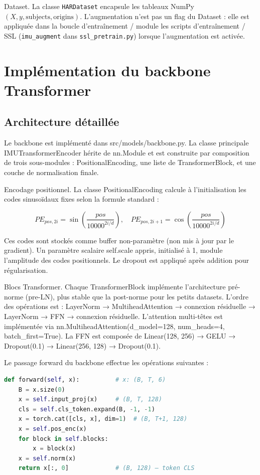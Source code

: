 \documentclass[a4paper,12pt]{report}
\begin{document}
Dataset. La classe \texttt{HARDataset} encapsule les tableaux NumPy
$(X, y, \mathrm{subjects}, \mathrm{origins})$. L'augmentation n'est pas un
flag du Dataset : elle est appliquée dans la boucle d'entraînement / module
les scripts d'entraînement / SSL (\texttt{imu\_augment} dans \texttt{ssl\_pretrain.py}) lorsque l'augmentation est activée.

\section{Implémentation du backbone Transformer}

\subsection{Architecture détaillée}

Le backbone est implémenté dans src/models/backbone.py. La classe principale IMUTransformerEncoder hérite de nn.Module et est construite par composition de trois sous-modules : PositionalEncoding, une liste de TransformerBlock, et une couche de normalisation finale.

Encodage positionnel. La classe PositionalEncoding calcule à l'initialisation les codes sinusoïdaux fixes selon la formule standard :

$$PE_{pos, 2i} = \sin\left(\frac{pos}{10000^{2i/d}}\right), \quad PE_{pos, 2i+1} = \cos\left(\frac{pos}{10000^{2i/d}}\right)$$

Ces codes sont stockés comme buffer non-paramètre (non mis à jour par le gradient). Un paramètre scalaire self.scale appris, initialisé à 1, module l'amplitude des codes positionnels. Le dropout est appliqué après addition pour régularisation.

Blocs Transformer. Chaque TransformerBlock implémente l'architecture pré-norme (pre-LN), plus stable que la post-norme pour les petits datasets. L'ordre des opérations est : LayerNorm → MultiheadAttention → connexion résiduelle → LayerNorm → FFN → connexion résiduelle. L'attention multi-têtes est implémentée via nn.MultiheadAttention(d\_model=128, num\_heads=4, batch\_first=True). La FFN est composée de Linear(128, 256) → GELU → Dropout(0.1) → Linear(256, 128) → Dropout(0.1).

Le passage forward du backbone effectue les opérations suivantes :

\begin{lstlisting}[language=Python,caption={Forward pass du backbone},label=lst:backbone_forward]
def forward(self, x):          # x: (B, T, 6)
    B = x.size(0)
    x = self.input_proj(x)     # (B, T, 128)
    cls = self.cls_token.expand(B, -1, -1)
    x = torch.cat([cls, x], dim=1)  # (B, T+1, 128)
    x = self.pos_enc(x)
    for block in self.blocks:
        x = block(x)
    x = self.norm(x)
    return x[:, 0]             # (B, 128) — token CLS
\end{lstlisting}
\end{document}
